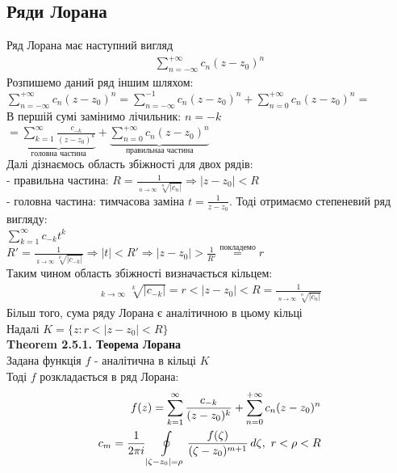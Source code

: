 \documentclass[a4paper, 14pt]{extarticle}
\DeclareMathOperator*\uplim{\overline{lim}}
\def\hugespace{\vspace{5mm} \\}
\begin{document}
	\subsection{Ряди Лорана}
	Ряд Лорана має наступний вигляд
	\begin{align*}
	\sum_{n=-\infty}^{+\infty} c_n(z-z_0)^n
	\end{align*}
	Розпишемо даний ряд іншим шляхом:\\
	$\displaystyle \sum_{n=-\infty}^{+\infty} c_n(z-z_0)^n = \sum_{n=-\infty}^{-1} c_n(z-z_0)^n + \sum_{n=0}^{+\infty} c_n(z-z_0)^n =$\\
	В першій сумі замінимо лічильник: $n=-k$\\
	$\displaystyle = \underbrace{\sum_{k=1}^{\infty} \frac{c_{-k}}{(z-z_0)^k}}_{\textrm{головна частина}} + \underbrace{\sum_{n=0}^{+\infty} c_n(z-z_0)^n}_{\textrm{правильнаа частина}}$\\
	Далі дізнаємось область збіжності для двох рядів:\\
	- правильна частина: $R = \displaystyle\frac{1}{\displaystyle\uplim_{n \to \infty} \sqrt[n]{|c_n|}} \Rightarrow |z-z_0|<R$\\
	- головна частина: тимчасова заміна $\displaystyle t=\frac{1}{z-z_0}$. Тоді отримаємо степеневий ряд вигляду:\\
	$\displaystyle \sum_{k=1}^{\infty} c_{-k}t^k$\\
	$R' = \displaystyle\frac{1}{\displaystyle\uplim_{k \to \infty} \sqrt[k]{|c_{-k}|}} \Rightarrow |t|<R' \Rightarrow |z-z_0|>\frac{1}{R'} \overset{\textrm{покладемо}}{=} r$\\
	Таким чином область збіжності визначається кільцем:
	\begin{align*}
	\uplim_{k \to \infty} \sqrt[k]{|c_{-k}|}=r<|z-z_0|<R=\frac{1}{\displaystyle\uplim_{n \to \infty} \sqrt[n]{|c_n|}}
	\end{align*}
	Більш того, сума ряду Лорана є аналітичною в цьому кільці\\
	Надалі $K=\{z: r<|z-z_0|<R\}$
	\hugespace
	\textbf{Theorem 2.5.1. Теорема Лорана}\\
	Задана функція $f$ - аналітична в кільці $K$\\
	Тоді $f$ розкладається в ряд Лорана:
	\begin{align*}
	f(z)= \sum_{k=1}^{\infty}\frac{c_{-k}}{(z-z_0)^k}  + \sum_{n=0}^{+\infty} c_n(z-z_0)^n\\
	c_m = \frac{1}{2 \pi i}\oint\displaylimits_{|\zeta-z_0|=\rho} \frac{f(\zeta)}{(\zeta-z_0)^{m+1}} \,d\zeta, \textrm{ } r<\rho<R
	\end{align*}
\end{document}

